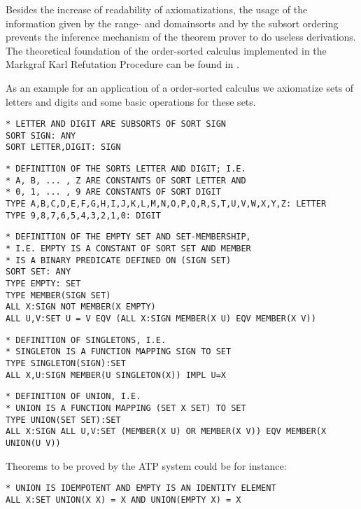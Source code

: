 Besides the increase of readability of axiomatizations, the usage of
the information given by the range- and domainsorts and by the subsort
ordering prevents the inference mechanism of the theorem prover to do
useless derivations. The theoretical foundation of the order-sorted
calculus implemented in the {\sc Markgraf Karl Refutation Procedure}
can be found in \cite{Walther84}. 

As an example for an application of a order-sorted calculus we axiomatize 
sets of letters and digits and some basic operations for these sets.
 
\Ex
\begin{verbatim}
* LETTER AND DIGIT ARE SUBSORTS OF SORT SIGN
SORT SIGN: ANY
SORT LETTER,DIGIT: SIGN
\end{verbatim}

\begin{verbatim}
* DEFINITION OF THE SORTS LETTER AND DIGIT; I.E.
* A, B, ... , Z ARE CONSTANTS OF SORT LETTER AND  
* 0, 1, ... , 9 ARE CONSTANTS OF SORT DIGIT
TYPE A,B,C,D,E,F,G,H,I,J,K,L,M,N,O,P,Q,R,S,T,U,V,W,X,Y,Z: LETTER
TYPE 9,8,7,6,5,4,3,2,1,0: DIGIT
\end{verbatim}

\begin{verbatim}
* DEFINITION OF THE EMPTY SET AND SET-MEMBERSHIP,
* I.E. EMPTY IS A CONSTANT OF SORT SET AND MEMBER
* IS A BINARY PREDICATE DEFINED ON (SIGN SET)
SORT SET: ANY
TYPE EMPTY: SET
TYPE MEMBER(SIGN SET)
ALL X:SIGN NOT MEMBER(X EMPTY)
ALL U,V:SET U = V EQV (ALL X:SIGN MEMBER(X U) EQV MEMBER(X V))
\end{verbatim}

\begin{verbatim}
* DEFINITION OF SINGLETONS, I.E.
* SINGLETON IS A FUNCTION MAPPING SIGN TO SET
TYPE SINGLETON(SIGN):SET
ALL X,U:SIGN MEMBER(U SINGLETON(X)) IMPL U=X
\end{verbatim}

\begin{verbatim}
* DEFINITION OF UNION, I.E.
* UNION IS A FUNCTION MAPPING (SET X SET) TO SET
TYPE UNION(SET SET):SET
ALL X:SIGN ALL U,V:SET (MEMBER(X U) OR MEMBER(X V)) EQV MEMBER(X UNION(U V))
\end{verbatim}
Theorems to be proved by the ATP system could be for instance:
\begin{verbatim}
* UNION IS IDEMPOTENT AND EMPTY IS AN IDENTITY ELEMENT
ALL X:SET UNION(X X) = X AND UNION(EMPTY X) = X
\end{verbatim}

